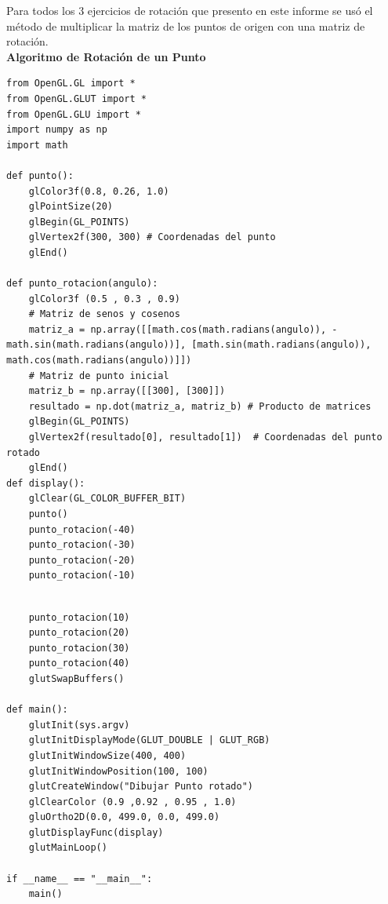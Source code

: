 \documentclass[a4paper]{article}
\begin{document}
\restoregeometry
\newpage

\large{Para todos los 3 ejercicios de rotación que presento en este informe se usó el método de multiplicar la matriz de los puntos de origen con una matriz de rotación.}\\
\Large{\textbf{Algoritmo de Rotación de un Punto}}\\[-0.4cm]
\begin{center}
\begin{mycodeboxl}
\begin{lstlisting}
from OpenGL.GL import *
from OpenGL.GLUT import *
from OpenGL.GLU import *
import numpy as np
import math

def punto():
    glColor3f(0.8, 0.26, 1.0)
    glPointSize(20) 
    glBegin(GL_POINTS)
    glVertex2f(300, 300) # Coordenadas del punto
    glEnd()

def punto_rotacion(angulo):
    glColor3f (0.5 , 0.3 , 0.9)
    # Matriz de senos y cosenos
    matriz_a = np.array([[math.cos(math.radians(angulo)), -math.sin(math.radians(angulo))], [math.sin(math.radians(angulo)), math.cos(math.radians(angulo))]])
    # Matriz de punto inicial 
    matriz_b = np.array([[300], [300]])
    resultado = np.dot(matriz_a, matriz_b) # Producto de matrices
    glBegin(GL_POINTS)
    glVertex2f(resultado[0], resultado[1])  # Coordenadas del punto rotado 
    glEnd()
def display():
    glClear(GL_COLOR_BUFFER_BIT)
    punto()
    punto_rotacion(-40)
    punto_rotacion(-30)
    punto_rotacion(-20)
    punto_rotacion(-10)
\end{lstlisting}
\end{mycodeboxl}
\end{center}
\newpage
\begin{center}
\begin{mycodeboxl}
\begin{lstlisting}

    punto_rotacion(10)
    punto_rotacion(20)
    punto_rotacion(30)
    punto_rotacion(40)
    glutSwapBuffers()

def main():
    glutInit(sys.argv)
    glutInitDisplayMode(GLUT_DOUBLE | GLUT_RGB)
    glutInitWindowSize(400, 400)  
    glutInitWindowPosition(100, 100)
    glutCreateWindow("Dibujar Punto rotado")
    glClearColor (0.9 ,0.92 , 0.95 , 1.0)
    gluOrtho2D(0.0, 499.0, 0.0, 499.0)
    glutDisplayFunc(display)
    glutMainLoop()

if __name__ == "__main__":
    main()
\end{lstlisting}
\end{mycodeboxl}
\end{center}
\end{document}
